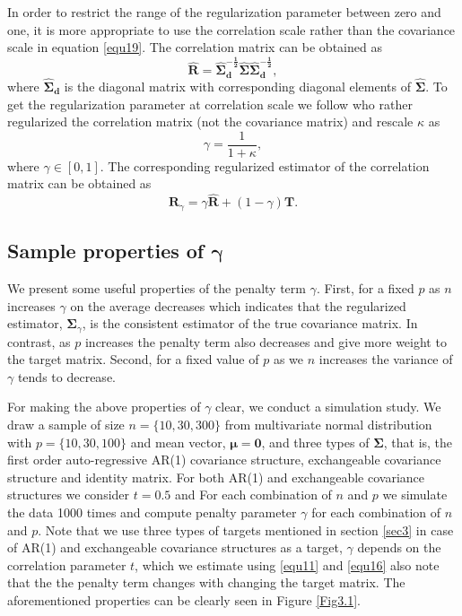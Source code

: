 In order to restrict the range of the regularization parameter between zero and one, it is more appropriate to use the correlation scale rather than the covariance scale in equation \ref{equ19}. The correlation matrix can be obtained as 
\begin{equation*}
\boldsymbol{\hat{R}} = \boldsymbol{\hat{\Sigma}_{d}^{-\frac{1}{2}}} \boldsymbol{\hat{\Sigma}} \boldsymbol{\hat{\Sigma}_{d}^{-\frac{1}{2}}},
\end{equation*}
where $\boldsymbol{\hat{\Sigma}_{d}}$ is the diagonal matrix with corresponding diagonal elements of  $\boldsymbol{\hat{\Sigma}}$. To get the regularization parameter at correlation scale we follow \cite{warton2008penalized} who rather regularized the correlation matrix (not the covariance matrix) and rescale $\kappa$ as
 \begin{equation}
 \gamma = \frac{1}{1+\kappa},
 \end{equation}
where $\gamma \in [0,1]$. The corresponding regularized estimator of the correlation matrix can be obtained as
\begin{equation}
\boldsymbol{R}_{\gamma} = \gamma \boldsymbol{\hat{R}}  + (1-\gamma) \boldsymbol{T}.
\end{equation}

\subsection{Sample properties of $\boldsymbol{\gamma}$}
We present some useful properties of the penalty term $\gamma$. First, for a fixed $p$ as $n$ increases $\gamma$ on the average decreases which indicates that the regularized estimator, $\boldsymbol{\Sigma}_{\gamma}$, is the consistent estimator of the true covariance matrix. In contrast, as $p$ increases the penalty term also decreases and give more weight to the target matrix. Second, for a fixed value of $p$ as we $n$ increases the variance of $\gamma$ tends to decrease.

 For making the above properties of $\gamma$ clear, we conduct a simulation study. We draw a sample of size $n= \lbrace 10,30,300 \rbrace$ from multivariate normal distribution with $p= \lbrace 10, 30, 100 \rbrace$ and mean vector, $\boldsymbol{\mu=0}$, and three types of $\boldsymbol{\Sigma}$, that is, the first order auto-regressive AR(1) covariance structure, exchangeable covariance structure and identity matrix. For both AR(1) and exchangeable covariance structures we consider $t=0.5$ and For each combination of $n$ and $p$ we simulate the data 1000 times and compute penalty parameter $\gamma$ for each combination of $n$ and $p$. Note that we use three types of targets mentioned in section \ref{sec3} in case of AR(1) and exchangeable covariance structures as a target, $\gamma$ depends on the correlation parameter $t$, which we estimate using \ref{equ11} and \ref{equ16} also note that the the penalty term changes with changing the target matrix. The aforementioned properties can be clearly seen in Figure \ref{Fig3.1}.
 


